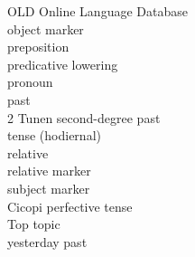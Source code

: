\documentclass[output=paper]{langscibook}
\begin{document}
\begin{multicols}{2}
\begin{tabbing}
OLD \> Online Language Database\\
\OM{} \> object marker\\
\PREP{} \> preposition\\ 
\PRL{} \> predicative lowering\\
\PRO{} \> pronoun\\
\PST{} \> past\\
\PST{}2 \> Tunen second-degree past \\ \>  tense (hodiernal) \\
\REL{} \> relative\\
\RM{} \> relative marker\\
\SM{} \> subject marker\\
\TO{} \> Cicopi perfective tense\\
Top \> topic\\
\YPST{} \> yesterday past
\end{tabbing}
\end{multicols}\largerpage


\printbibliography[heading=subbibliography,notkeyword=this]
\end{document}
